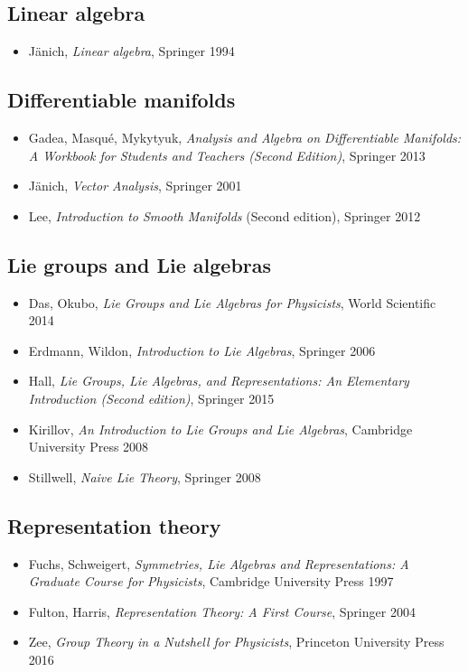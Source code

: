 \subsection*{Linear algebra}

\begin{itemize}
\item J\"anich, \textit{Linear algebra}, Springer 1994
\end{itemize}

\subsection*{Differentiable manifolds}

\begin{itemize}
\item Gadea, Masqu\'e, Mykytyuk, \textit{Analysis and Algebra on Differentiable Manifolds: A Workbook for Students and Teachers (Second Edition)}, Springer 2013
\item J\"anich, \textit{Vector Analysis}, Springer 2001
\item Lee, \textit{Introduction to Smooth Manifolds} (Second edition), Springer 2012
\end{itemize}

\subsection*{Lie groups and Lie algebras}

\begin{itemize}
\item Das, Okubo, \textit{Lie Groups and Lie Algebras for Physicists}, World Scientific 2014
\item Erdmann, Wildon, \textit{Introduction to Lie Algebras}, Springer 2006
\item Hall, \textit{Lie Groups, Lie Algebras, and Representations: An Elementary Introduction (Second edition)}, Springer 2015
\item Kirillov, \textit{An Introduction to Lie Groups and Lie Algebras}, Cambridge University Press 2008
\item Stillwell, \textit{Naive Lie Theory}, Springer 2008
\end{itemize}

\subsection*{Representation theory}

\begin{itemize}
\item Fuchs, Schweigert, \textit{Symmetries, Lie Algebras and Representations: A Graduate Course for Physicists}, Cambridge University Press 1997
\item Fulton, Harris, \textit{Representation Theory: A First Course}, Springer 2004
\item Zee, \textit{Group Theory in a Nutshell for Physicists}, Princeton University Press 2016
\end{itemize}

